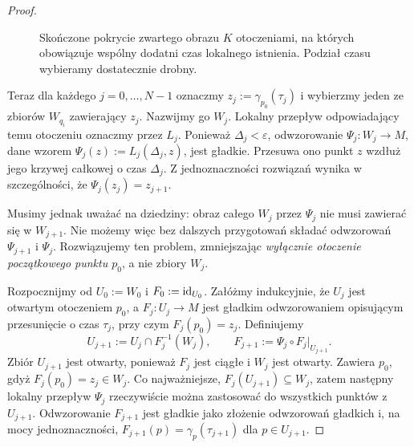 \begin{proof}
\begin{figure}[H]
\centering
{}

\caption{Skończone pokrycie zwartego obrazu $K$ otoczeniami,
na których obowiązuje wspólny dodatni czas lokalnego istnienia.
Podział czasu wybieramy dostatecznie drobny.}
\label{fig:przeplyw-pokrycie}
\end{figure}

Teraz dla każdego $j=0,\ldots,N-1$ oznaczmy
$z_j:=\gamma_{p_0}(\tau_j)$ i wybierzmy jeden ze zbiorów
$W_{q_i}$ zawierający $z_j$. Nazwijmy go $W_j$.
Lokalny przepływ odpowiadający temu otoczeniu oznaczmy przez
$L_j$. Ponieważ $\Delta_j<\varepsilon$, odwzorowanie
$\Psi_j\colon W_j\to M$, dane wzorem
$\Psi_j(z):=L_j(\Delta_j,z)$, jest gładkie.
Przesuwa ono punkt $z$ wzdłuż jego krzywej całkowej o czas
$\Delta_j$. Z jednoznaczności rozwiązań wynika w szczególności,
że $\Psi_j(z_j)=z_{j+1}$.

Musimy jednak uważać na dziedziny: obraz całego $W_j$ przez
$\Psi_j$ nie musi zawierać się w $W_{j+1}$. Nie możemy więc bez
dalszych przygotowań składać odwzorowań $\Psi_{j+1}$ i $\Psi_j$.
Rozwiązujemy ten problem, zmniejszając \emph{wyłącznie otoczenie
początkowego punktu $p_0$}, a nie zbiory $W_j$.

Rozpocznijmy od $U_0:=W_0$ i $F_0:=\mathrm{id}_{U_0}$.
Załóżmy indukcyjnie, że $U_j$ jest otwartym otoczeniem $p_0$,
a $F_j\colon U_j\to M$ jest gładkim odwzorowaniem opisującym
przesunięcie o czas $\tau_j$, przy czym $F_j(p_0)=z_j$.
Definiujemy
\[
U_{j+1}:=U_j\cap F_j^{-1}(W_j),\qquad
F_{j+1}:=\Psi_j\circ F_j\big|_{U_{j+1}}.
\]
Zbiór $U_{j+1}$ jest otwarty, ponieważ $F_j$ jest ciągłe
i $W_j$ jest otwarty. Zawiera $p_0$, gdyż
$F_j(p_0)=z_j\in W_j$. Co najważniejsze,
$F_j(U_{j+1})\subseteq W_j$, zatem następny lokalny przepływ
$\Psi_j$ rzeczywiście można zastosować do wszystkich punktów
z $U_{j+1}$. Odwzorowanie $F_{j+1}$ jest gładkie jako złożenie
odwzorowań gładkich i, na mocy jednoznaczności,
$F_{j+1}(p)=\gamma_p(\tau_{j+1})$ dla $p\in U_{j+1}$.


\end{proof}
